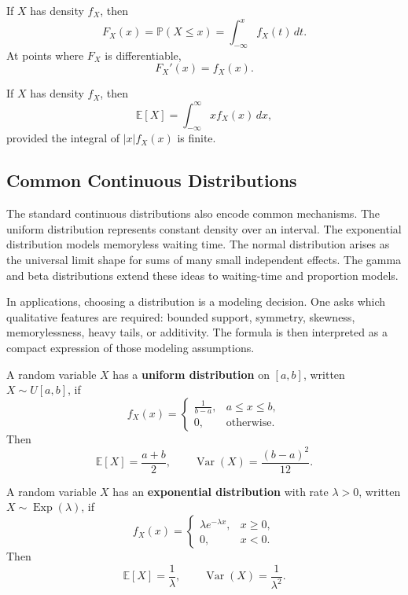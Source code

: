 \begin{definition}
If $X$ has density $f_X$, then
\[
    F_X(x)=\mathbb{P}(X\leq x)=\int_{-\infty}^{x}f_X(t)\,dt.
\]
At points where $F_X$ is differentiable,
\[
    F_X'(x)=f_X(x).
\]
\end{definition}

\begin{definition}[Expectation]
If $X$ has density $f_X$, then
\[
    \mathbb{E}[X]=\int_{-\infty}^{\infty}x f_X(x)\,dx,
\]
provided the integral of $|x|f_X(x)$ is finite.
\end{definition}

\subsection{Common Continuous Distributions}


The standard continuous distributions also encode common mechanisms. The uniform distribution represents constant density over an interval. The exponential distribution models memoryless waiting time. The normal distribution arises as the universal limit shape for sums of many small independent effects. The gamma and beta distributions extend these ideas to waiting-time and proportion models.

In applications, choosing a distribution is a modeling decision. One asks which qualitative features are required: bounded support, symmetry, skewness, memorylessness, heavy tails, or additivity. The formula is then interpreted as a compact expression of those modeling assumptions.

\begin{definition}
A random variable $X$ has a \textbf{uniform distribution} on $[a,b]$, written $X\sim U[a,b]$, if
\[
    f_X(x)=
    \begin{cases}
    \frac{1}{b-a},&a\leq x\leq b,\\
    0,&\text{otherwise}.
    \end{cases}
\]
Then
\[
    \mathbb{E}[X]=\frac{a+b}{2},
    \qquad
    \operatorname{Var}(X)=\frac{(b-a)^2}{12}.
\]
\end{definition}

\begin{definition}
A random variable $X$ has an \textbf{exponential distribution} with rate $\lambda>0$, written $X\sim\operatorname{Exp}(\lambda)$, if
\[
    f_X(x)=
    \begin{cases}
    \lambda e^{-\lambda x},&x\geq 0,\\
    0,&x<0.
    \end{cases}
\]
Then
\[
    \mathbb{E}[X]=\frac{1}{\lambda},
    \qquad
    \operatorname{Var}(X)=\frac{1}{\lambda^2}.
\]
\end{definition}

